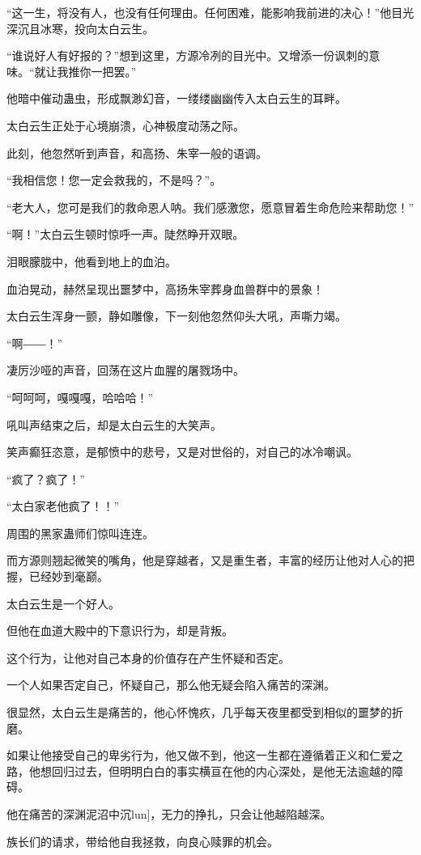 \begin{this_body}
“这一生，将没有人，也没有任何理由。任何困难，能影响我前进的决心！”他目光深沉且冰寒，投向太白云生。

“谁说好人有好报的？”想到这里，方源冷冽的目光中。又增添一份讽刺的意味。“就让我推你一把罢。”

他暗中催动蛊虫，形成飘渺幻音，一缕缕幽幽传入太白云生的耳畔。

太白云生正处于心境崩溃，心神极度动荡之际。

此刻，他忽然听到声音，和高扬、朱宰一般的语调。

“我相信您！您一定会救我的，不是吗？”。

“老大人，您可是我们的救命恩人呐。我们感激您，愿意冒着生命危险来帮助您！”

“啊！”太白云生顿时惊呼一声。陡然睁开双眼。

泪眼朦胧中，他看到地上的血泊。

血泊晃动，赫然呈现出噩梦中，高扬朱宰葬身血兽群中的景象！

太白云生浑身一颤，静如雕像，下一刻他忽然仰头大吼，声嘶力竭。

“啊――！”

凄厉沙哑的声音，回荡在这片血腥的屠戮场中。

“呵呵呵，嘎嘎嘎，哈哈哈！”

吼叫声结束之后，却是太白云生的大笑声。

笑声癫狂恣意，是郁愤中的悲号，又是对世俗的，对自己的冰冷嘲讽。

“疯了？疯了！”

“太白家老他疯了！！”

周围的黑家蛊师们惊叫连连。

而方源则翘起微笑的嘴角，他是穿越者，又是重生者，丰富的经历让他对人心的把握，已经妙到毫巅。

太白云生是一个好人。

但他在血道大殿中的下意识行为，却是背叛。

这个行为，让他对自己本身的价值存在产生怀疑和否定。

一个人如果否定自己，怀疑自己，那么他无疑会陷入痛苦的深渊。

很显然，太白云生是痛苦的，他心怀愧疚，几乎每天夜里都受到相似的噩梦的折磨。

如果让他接受自己的卑劣行为，他又做不到，他这一生都在遵循着正义和仁爱之路，他想回归过去，但明明白白的事实横亘在他的内心深处，是他无法逾越的障碍。

他在痛苦的深渊泥沼中沉lun]，无力的挣扎，只会让他越陷越深。

族长们的请求，带给他自我拯救，向良心赎罪的机会。


\end{this_body}
